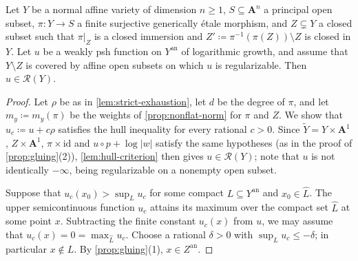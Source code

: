 \documentclass[11pt,a4paper]{article}
\newcommand{\an}{\mathrm{an}}          %
\begin{document}
\begin{proposition}\label{prop:projection-step}
Let $Y$ be a normal affine variety of dimension $n\ge1$, $S\subseteq\mathbf A^n$ a principal open subset, $\pi\colon Y\to S$ a finite surjective generically \'etale morphism, and $Z\subsetneq Y$ a closed subset such that $\pi|_Z$ is a closed immersion and $Z'\coloneqq\pi^{-1}(\pi(Z))\setminus Z$ is closed in $Y$. Let $u$ be a weakly psh function on $Y^{\an}$ of logarithmic growth, and assume that $Y\setminus Z$ is covered by affine open subsets on which $u$ is regularizable. Then $u\in\mathcal{R}(Y)$.
\end{proposition}

\begin{proof}
Let $\rho$ be as in \cref{lem:strict-exhaustion}, let $d$ be the degree of $\pi$, and let $m_y\coloneqq m_y(\pi)$ be the weights of \cref{prop:nonflat-norm} for $\pi$ and $Z$. We show that $u_c\coloneqq u+c\rho$ satisfies the hull inequality for every rational $c>0$. Since $\widetilde Y=Y\times\mathbf A^1$, $Z\times\mathbf A^1$, $\pi\times\mathrm{id}$ and $u\circ p+\log|w|$ satisfy the same hypotheses (as in the proof of \cref{prop:gluing}(2)), \cref{lem:hull-criterion} then gives $u\in\mathcal{R}(Y)$; note that $u$ is not identically $-\infty$, being regularizable on a nonempty open subset.

Suppose that $u_c(x_0)>\sup_Lu_c$ for some compact $L\subseteq Y^{\an}$ and $x_0\in\widehat L$. The upper semicontinuous function $u_c$ attains its maximum over the compact set $\widehat L$ at some point $x$. Subtracting the finite constant $u_c(x)$ from $u$, we may assume that $u_c(x)=0=\max_{\widehat L}u_c$. Choose a rational $\delta>0$ with $\sup_Lu_c\le-\delta$; in particular $x\notin L$. By \cref{prop:gluing}(1), $x\in Z^{\an}$.


\end{proof}
\end{document}

